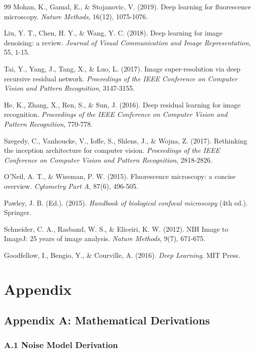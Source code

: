 \documentclass[12pt,a4paper]{report}
\begin{document}
\begin{thebibliography}{99}
Mohan, K., Gamal, E., \& Stojanovic, V. (2019). Deep learning for fluorescence microscopy. \textit{Nature Methods}, 16(12), 1075-1076.

Liu, Y. T., Chen, H. Y., \& Wang, Y. C. (2018). Deep learning for image denoising: a review. \textit{Journal of Visual Communication and Image Representation}, 55, 1-15.

Tai, Y., Yang, J., Tang, X., \& Luo, L. (2017). Image super-resolution via deep recursive residual network. \textit{Proceedings of the IEEE Conference on Computer Vision and Pattern Recognition}, 3147-3155.

He, K., Zhang, X., Ren, S., \& Sun, J. (2016). Deep residual learning for image recognition. \textit{Proceedings of the IEEE Conference on Computer Vision and Pattern Recognition}, 770-778.

Szegedy, C., Vanhoucke, V., Ioffe, S., Shlens, J., \& Wojna, Z. (2017). Rethinking the inception architecture for computer vision. \textit{Proceedings of the IEEE Conference on Computer Vision and Pattern Recognition}, 2818-2826.

O'Neil, A. T., \& Wiseman, P. W. (2015). Fluorescence microscopy: a concise overview. \textit{Cytometry Part A}, 87(6), 496-505.

Pawley, J. B. (Ed.). (2015). \textit{Handbook of biological confocal microscopy} (4th ed.). Springer.

Schneider, C. A., Rasband, W. S., \& Eliceiri, K. W. (2012). NIH Image to ImageJ: 25 years of image analysis. \textit{Nature Methods}, 9(7), 671-675.

Goodfellow, I., Bengio, Y., \& Courville, A. (2016). \textit{Deep Learning}. MIT Press.

\end{thebibliography}

\iffalse
\chapter*{Appendix}
\thispagestyle{plain}

\section*{Appendix A: Mathematical Derivations}

\subsection*{A.1 Noise Model Derivation}
\end{document}
